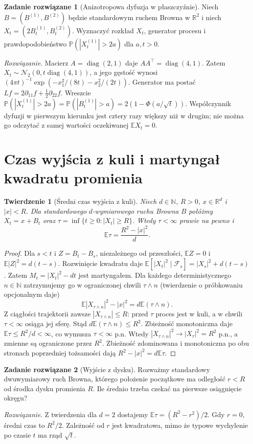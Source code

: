 \documentclass[11pt,a4paper,oneside]{report}
\numberwithin{equation}{chapter}
\theoremstyle{plain}
\newtheorem{twierdzenie}{Twierdzenie}[chapter]
\theoremstyle{definition}
\newtheorem{zadanie}{Zadanie rozwiązane}[chapter]
\theoremstyle{remark}
\newcommand{\R}{\mathbb{R}}
\newcommand{\N}{\mathbb{N}}
\newcommand{\Prob}{\mathbb{P}}
\newcommand{\E}{\mathbb{E}}
\newcommand{\calF}{\mathcal{F}}
\newcommand{\Normal}{\mathcal{N}}
\begin{document}
\begin{zadanie}[Anizotropowa dyfuzja w płaszczyźnie]
Niech $B=(B^{(1)},B^{(2)})$ będzie standardowym ruchem Browna
w $\R^2$ i niech $X_t=(2B_t^{(1)},B_t^{(2)})$.
Wyznaczyć rozkład $X_t$, generator procesu i prawdopodobieństwo
$\Prob(|X_t^{(1)}|>2a)$ dla $a,t>0$.

\emph{Rozwiązanie.} Macierz $A=\operatorname{diag}(2,1)$ daje
$AA^\top=\operatorname{diag}(4,1)$. Zatem
$X_t\sim\Normal_2(0,t\operatorname{diag}(4,1))$,
a jego gęstość wynosi
$ (4\pi t)^{-1}\exp(-x_1^2/(8t)-x_2^2/(2t))$.
Generator ma postać $Lf=2\partial_{11}f+\tfrac12\partial_{22}f$.
Wreszcie
$\Prob(|X_t^{(1)}|>2a)=\Prob(|B_t^{(1)}|>a)
=2(1-\Phi(a/\sqrt t))$.
Współczynnik dyfuzji w pierwszym kierunku jest cztery razy
większy niż w drugim; nie można go odczytać z samej
wartości oczekiwanej $\E X_t=0$.
\end{zadanie}

\section{Czas wyjścia z kuli i martyngał kwadratu promienia}
\begin{twierdzenie}[Średni czas wyjścia z kuli]
Niech $d\in\N$, $R>0$, $x\in\R^d$ i $|x|<R$.
Dla standardowego $d$-wymiarowego ruchu Browna $B$ połóżmy
$X_t=x+B_t$ oraz $\tau=\inf\{t\ge0:|X_t|\ge R\}$.
Wtedy $\tau<\infty$ prawie na pewno i
\[
\E\tau=\frac{R^2-|x|^2}{d}.
\]
\end{twierdzenie}
\begin{proof}
Dla $s<t$ i $Z=B_t-B_s$, niezależnego od przeszłości,
$\E Z=0$ i $\E|Z|^2=d(t-s)$. Rozwinięcie kwadratu daje
$\E[|X_t|^2\mid\calF_s]=|X_s|^2+d(t-s)$.
Zatem $M_t=|X_t|^2-dt$ jest martyngałem.
Dla każdego deterministycznego $n\in\N$ zatrzymujemy go
w ograniczonej chwili $\tau\wedge n$ (twierdzenie o
próbkowaniu opcjonalnym daje)
\[
\E|X_{\tau\wedge n}|^2-|x|^2=d\E(\tau\wedge n).
\]
Z ciągłości trajektorii zawsze $|X_{\tau\wedge n}|\le R$:
przed $\tau$ proces jest w kuli, a w chwili $\tau<\infty$
osiąga jej sferę. Stąd $d\E(\tau\wedge n)\le R^2$.
Zbieżność monotoniczna daje $\E\tau\le R^2/d<\infty$,
co wymusza $\tau<\infty$ p.n. Wtedy
$|X_{\tau\wedge n}|^2\to|X_\tau|^2=R^2$ p.n., a
zmienne są ograniczone przez $R^2$. Zbieżność zdominowana
i monotoniczna po obu stronach poprzedniej tożsamości dają
$R^2-|x|^2=d\E\tau$.
\end{proof}

\begin{zadanie}[Wyjście z dysku]
Rozważmy standardowy dwuwymiarowy ruch Browna, którego
położenie początkowe ma odległość $r<R$ od środka dysku
promienia $R$. Ile średnio trzeba czekać na pierwsze osiągnięcie
okręgu?

\emph{Rozwiązanie.} Z twierdzenia dla $d=2$ dostajemy
$\E\tau=(R^2-r^2)/2$. Gdy $r=0$, średni czas to $R^2/2$.
Zależność od $r$ jest kwadratowa, mimo że typowe wychylenie
po czasie $t$ ma rząd $\sqrt t$.
\end{zadanie}
\end{document}
